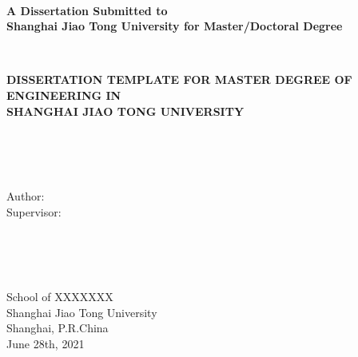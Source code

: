 \newpage
\thispagestyle{empty}
~\\
\begin{center}
\textbf{
A Dissertation Submitted to \\
Shanghai Jiao Tong University for Master/Doctoral Degree}
\end{center}
~\\
\begin{center}
\textbf{
DISSERTATION TEMPLATE FOR MASTER DEGREE OF ENGINEERING IN \\
SHANGHAI JIAO TONG UNIVERSITY}
\end{center}
~\\
~\\
~\\
\begin{center}
Author:  \\
Supervisor:  
\end{center}
~\\
~\\
~\\
\begin{center}
School of XXXXXXX \\
Shanghai Jiao Tong University \\
Shanghai, P.R.China \\
June 28th, 2021  
\end{center}

\newpage